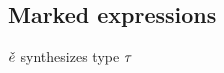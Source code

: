 \documentclass[formalism.tex]{subfiles}
\begin{document}
\begin{mathpar}

\end{mathpar}

\subsection{Marked expressions}
\label{sec:marked-marked-expressions}
\judgbox{\ctxSynTypeM{\ctx}{\ECMV}{\TMV}} $\ECMV$ synthesizes type $\TMV$
%
\end{document}
